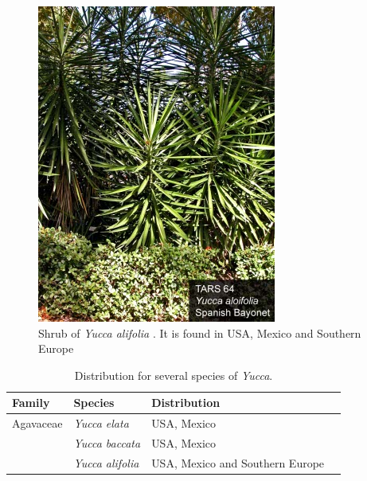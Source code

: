 \documentclass[a4paper]{article}
\begin{document}
\begin{figure}[H]
\centering
\includegraphics{images/yucca_alifolia_shrub}
\caption{Shrub of {\it Yucca alifolia} \citep{USDA}.
         It is found in USA, Mexico and Southern Europe} 
\end{figure}

\begin{table}[H]
\centering
\begin{tabular}{llll} \toprule
Family & Species & Distribution \\ \midrule
Agavaceae & {\it Yucca elata}    & USA, Mexico \\
          & {\it Yucca baccata}  & USA, Mexico \\
          & {\it Yucca alifolia} & USA, Mexico and Southern Europe \\
\bottomrule
\end{tabular}
\caption{Distribution for several species of {\it Yucca}.}
\end{table}

\clearpage
\end{document}
